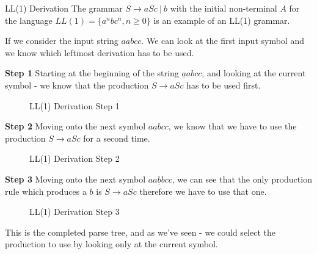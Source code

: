 \begin{example}{LL(1) Derivation}
The grammar $S \rightarrow aSc\ |\ b$ with the initial non-terminal $A$ for the language $LL(1) = \{a^nbc^n, n \geq 0\}$ is an example of an LL(1) grammar.

If we consider the input string $aabcc$. We can look at the first input symbol and we know which leftmost derivation has to be used.

\textbf{Step 1} Starting at the beginning of the string $\underline{a}abcc$, and looking at the current symbol - we know that the production $S \rightarrow aSc$ has to be used first.

\begin{figure}[H]
\centering
{}
\caption{LL(1) Derivation Step 1}
\end{figure}

\textbf{Step 2} Moving onto the next symbol $a\underline{a}bcc$, we know that we have to use the production $S \rightarrow aSc$ for a second time.

\begin{figure}[H]
\centering
{}
\caption{LL(1) Derivation Step 2}
\end{figure}


\textbf{Step 3} Moving onto the next symbol $aa\underline{b}bcc$, we can see that the only production rule which produces a $b$ is $S \rightarrow aSc$ therefore we have to use that one. 

\begin{figure}[H]
\centering
{}
\caption{LL(1) Derivation Step 3}
\end{figure}

This is the completed parse tree, and as we've seen - we could select the production to use by looking only at the current symbol.
\end{example}

